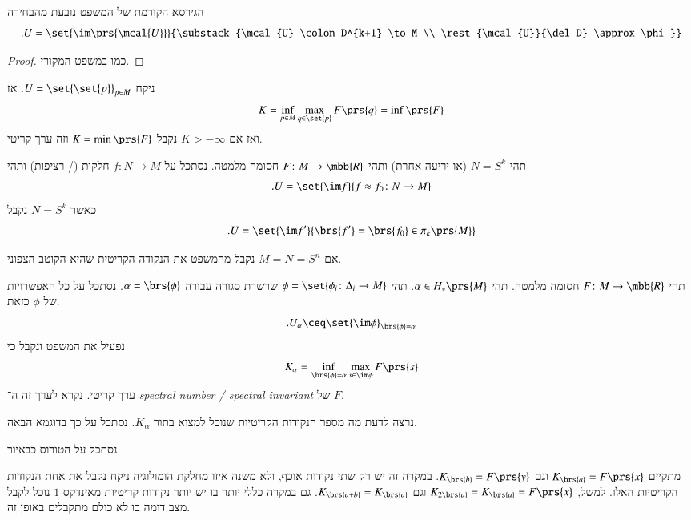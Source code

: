 \documentclass[a4paper,10pt,twoside,openany]{book}
\begin{document}
\begin{remark}
הגירסא הקודמת של המשפט נובעת מהבחירה
\[\text{.} U = \set{\im\prs{\mcal{U}}}{\substack{\mcal{U} \colon D^{k+1} \to M \\ \rest{\mcal{U}}{\del D} \approx \phi}}\]
\end{remark}

\begin{proof}
כמו במשפט המקורי.
\end{proof}

\begin{example}
ניקח
$U = \set{\set{p}}_{p \in M}$.
אז
\[K = \inf_{p \in M} \max_{q \in \set{p}} F\prs{q} = \inf \prs{F}\]
ואז אם
$K > -\infty$
נקבל
$K = \min\prs{F}$
וזה ערך קריטי.
\end{example}

\begin{example}
תהי
$N = S^k$
(או יריעה אחרת) ותהי
$F \colon M \to \mbb{R}$
חסומה מלמטה. נסתכל על
$f \colon N \to M$
חלקות (/ רציפות) ותהי
\[\text{.} U = \set{\im f}{f \approx f_0 \colon N \to M}\]
כאשר
$N = S^k$
נקבל
\[\text{.} U = \set{\im f'}{\brs{f'} = \brs{f_0} \in \pi_k\prs{M}}\]

אם
$M = N = S^n$
נקבל מהמשפט את הנקודה הקריטית שהיא הקוטב הצפוני.
\end{example}

\begin{example}
תהי
$F \colon M \to \mbb{R}$
חסומה מלמטה.
תהי
$\alpha \in H_*\prs{M}$.
תהי
$\phi = \set{\phi_i \colon \Delta_i \to M}$
שרשרת סגורה עבורה
$\alpha = \brs{\phi}$.
נסתכל על כל האפשרויות של
$\phi$
כזאת.
\[\text{.} U_\alpha \ceq \set{\im \phi}_{\brs{\phi} = \alpha}\]
נפעיל את המשפט ונקבל כי
\[K_\alpha = \inf_{\brs{\phi} = \alpha} \max_{s \in \im \phi} F\prs{s}\]
ערך קריטי.
נקרא לערך זה ה־%
\emph{\textenglish{spectral number / spectral invariant}}
של
$F$.
\end{example}

נרצה לדעת מה מספר הנקודות הקריטיות שנוכל למצוא בתור
$K_\alpha$.
נסתכל על כך בדוגמא הבאה.

\begin{example}
נסתכל על הטורוס כבאיור

מתקיים
$K_{\brs{a}} = F\prs{x}$
וגם
$K_{\brs{b}} = F\prs{y}$.
במקרה זה יש רק שתי נקודות אוכף, ולא משנה איזו מחלקת הומולוגיה ניקח נקבל את אחת הנקודות הקריטיות האלו.
למשל,
$K_{2 \brs{a}} = K_{\brs{a}} = F\prs{x}$
וגם
$K_{\brs{a+b}} = K_{\brs{a}}$.
גם במקרה כללי יותר בו יש יותר נקודות קריטיות מאינדקס
$1$
נוכל לקבל מצב דומה בו לא כולם מתקבלים באופן זה.
\end{example}
\end{document}
